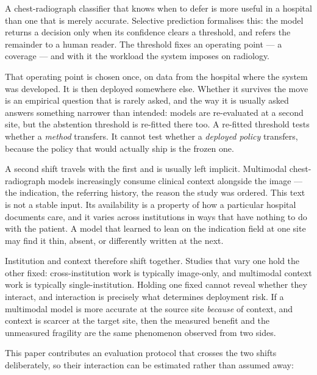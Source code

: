 

A chest-radiograph classifier that knows when to defer is more useful in a
hospital than one that is merely accurate. Selective prediction formalises
this: the model returns a decision only when its confidence clears a threshold,
and refers the remainder to a human reader. The threshold fixes an operating
point --- a coverage --- and with it the workload the system imposes on
radiology.

That operating point is chosen once, on data from the hospital where the system
was developed. It is then deployed somewhere else. Whether it survives the move
is an empirical question that is rarely asked, and the way it is usually asked
answers something narrower than intended: models are re-evaluated at a second
site, but the abstention threshold is re-fitted there too. A re-fitted threshold
tests whether a \emph{method} transfers. It cannot test whether a \emph{deployed
policy} transfers, because the policy that would actually ship is the frozen
one.

A second shift travels with the first and is usually left implicit. Multimodal
chest-radiograph models increasingly consume clinical context alongside the
image --- the indication, the referring history, the reason the study was
ordered. This text is not a stable input. Its availability is a property of how
a particular hospital documents care, and it varies across institutions in ways
that have nothing to do with the patient. A model that learned to lean on the
indication field at one site may find it thin, absent, or differently written at
the next.

Institution and context therefore shift together. Studies that vary one hold the
other fixed: cross-institution work is typically image-only, and multimodal
context work is typically single-institution. Holding one fixed cannot reveal
whether they interact, and interaction is precisely what determines deployment
risk. If a multimodal model is more accurate at the source site \emph{because}
of context, and context is scarcer at the target site, then the measured benefit
and the unmeasured fragility are the same phenomenon observed from two sides.

This paper contributes an evaluation protocol that crosses the two shifts
deliberately, so their interaction can be estimated rather than assumed away:

